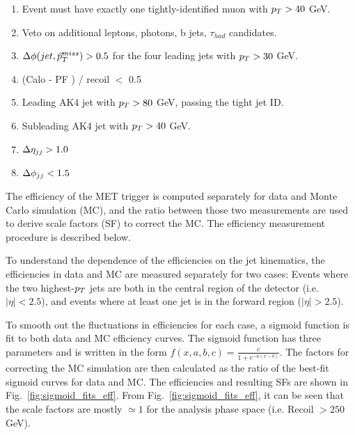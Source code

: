 \begin{enumerate}
  \item Event must have exactly one tightly-identified muon with $p_T > 40$ GeV.
  \item Veto on additional leptons, photons, b jets, $\tau_{had}$ candidates.
  \item $\Delta\phi(jet,\vec{p}_{T}^{miss})>0.5$ for the four leading jets with $p_T>30$ GeV.
  \item (Calo \ptmiss - PF \ptmiss) / recoil $<$ 0.5
  \item Leading AK4 jet with $p_T>80$ GeV, passing the tight jet ID.
  \item Subleading AK4 jet with $p_T>40$ GeV.
  \item $\Delta \eta_{jj} > 1.0$
  \item $\Delta \phi_{jj} < 1.5$
\end{enumerate}

The efficiency of the MET trigger is computed separately for data and Monte Carlo simulation (MC),
and the ratio between those two measurements are used to derive scale factors (SF) to correct the MC.
The efficiency measurement procedure is described below.

To understand the dependence of the efficiencies on the jet kinematics, the efficiencies in data and MC are measured 
separately for two cases: Events where the two highest-$p_T$ jets are both in the central region of the detector (i.e. $|\eta| < 2.5$), 
and events where at least one jet is in the forward region ($|\eta| > 2.5$).

To smooth out the fluctuations in efficiencies for each case, a sigmoid function is fit to both data and MC 
efficiency curves. The sigmoid function has three parameters and is written in the form $f(x,a,b,c) = \frac{c}{1+e^{-a(x-b)}}$. 
The factors for correcting the MC simulation are then calculated as the ratio of the best-fit sigmoid curves for data and MC.
The efficiencies and resulting SFs are shown in Fig.~\ref{fig:sigmoid_fits_eff}. From Fig.~\ref{fig:sigmoid_fits_eff}, 
it can be seen that the scale factors are mostly $\simeq 1$ for the analysis phase space (i.e. Recoil $> 250$ GeV).

